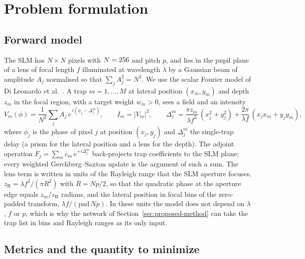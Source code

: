 \section{Problem formulation}\label{sec:problem}

\subsection{Forward model}\label{sec:forward}

The SLM has $N\times N$ pixels with $N=256$ and pitch $p$, and lies in the pupil plane of a lens of focal length $f$ illuminated at wavelength $\lambda$ by a Gaussian beam of amplitude $A_j$ normalised so that $\sum_jA_j^2=N^2$. We use the scalar
Fourier model of Di Leonardo et al.~\cite{dileonardo}. A trap $m=1,\dots,M$ at lateral position $(x_m,y_m)$ and depth $z_m$ in the focal region, with a target weight $w_m>0$, sees a field and an intensity
\begin{equation}
V_m(\phi)=\frac{1}{N^2}\sum_{j}A_j\,e^{\,i(\phi_j-\Delta_j^m)},\qquad I_m=|V_m|^2,\qquad
\Delta_j^m=\frac{\pi z_m}{\lambda f^2}\,(x_j^2+y_j^2)+\frac{2\pi}{\lambda f}\,(x_jx_m+y_jy_m),
\label{eq:forward}
\end{equation}
where $\phi_j$ is the phase of pixel $j$ at position $(x_j,y_j)$ and $\Delta_j^m$ the single-trap delay (a prism for the lateral position and a lens for the depth). The adjoint operation
$F_j=\sum_mc_m\,e^{+i\Delta_j^m}$ back-projects trap coefficients to the SLM plane; every weighted Gerchberg--Saxton update is the argument of such a sum. The lens term is written in units of the Rayleigh range that
the SLM aperture focuses, $z_{\mathrm R}=\lambda f^2/(\pi R^2)$ with $R=Np/2$, so that the quadratic phase at the aperture edge equals $z_m/z_{\mathrm R}$ radians, and the lateral position in focal bins of the zero-padded transform, $\lambda f/(\mathrm{pad}\,Np)$. In these units the model
does not depend on $\lambda$, $f$ or $p$, which is why the network of Section~\ref{sec:proposed-method} can take the trap list in bins and Rayleigh ranges as its only input.

\subsection{Metrics and the quantity to minimize}\label{sec:metrics}

